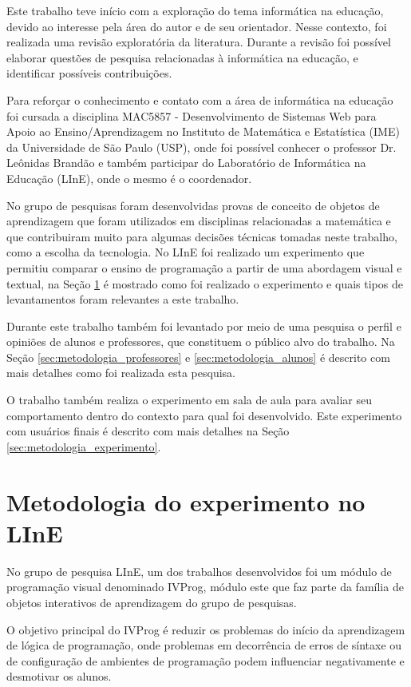Este trabalho teve início com a exploração do tema informática na educação, devido ao interesse pela área do autor e de seu orientador. Nesse contexto, foi realizada uma revisão exploratória da literatura. Durante a revisão foi possível elaborar questões de pesquisa relacionadas à informática na educação, e identificar possíveis contribuições.

Para reforçar o conhecimento e contato com a área de informática na educação foi cursada a disciplina MAC5857 - Desenvolvimento de Sistemas Web para Apoio ao Ensino/Aprendizagem no Instituto de Matemática e Estatística (IME) da Universidade de São Paulo (USP), onde foi possível conhecer o professor Dr. Leônidas Brandão e também participar do Laboratório de Informática na Educação (LInE), onde o mesmo é o coordenador.

No grupo de pesquisas foram desenvolvidas provas de conceito de objetos de aprendizagem que foram utilizados em disciplinas relacionadas a matemática e que contribuiram muito para algumas decisões técnicas tomadas neste trabalho, como a escolha da tecnologia. No LInE foi realizado um experimento que permitiu comparar o ensino de programação a partir de uma abordagem visual e textual, na Seção \ref{sec:metodologia_line} é mostrado como foi realizado o experimento e quais tipos de levantamentos foram relevantes a este trabalho.

Durante este trabalho também foi levantado por meio de uma pesquisa o perfil e opiniões de alunos e professores, que constituem o público alvo do trabalho. Na Seção \ref{sec:metodologia_professores} e \ref{sec:metodologia_alunos} é descrito com mais detalhes como foi realizada esta pesquisa.

O trabalho também realiza o experimento em sala de aula para avaliar seu comportamento dentro do contexto para qual foi desenvolvido. Este experimento com usuários finais é descrito com mais detalhes na Seção \ref{sec:metodologia_experimento}.

\section{Metodologia do experimento no LInE}
\label{sec:metodologia_line}

No grupo de pesquisa LInE, um dos trabalhos desenvolvidos foi um módulo de programação visual denominado IVProg, módulo este que faz parte da família de objetos interativos de aprendizagem do grupo de pesquisas.


O objetivo principal do IVProg é reduzir os problemas do início da aprendizagem de lógica de programação, onde problemas em decorrência de erros de síntaxe ou de configuração de ambientes de programação podem influenciar negativamente e desmotivar os alunos.

